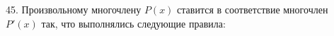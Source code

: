 45. Произвольному многочлену $P(x)$ ставится в соответствие многочлен $P'(x)$ так, что выполнялись следующие правила:\\

